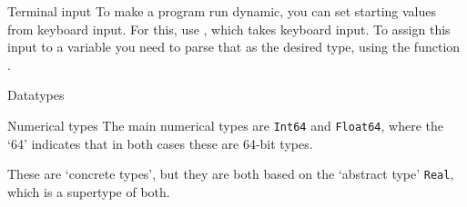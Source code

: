 \begin{comment}
\begin{exercise}
  \label{q:initvar}
  \begin{lstlisting}
    #include <iostream>
    using std::cout;
    using std::endl;
    int main() {
      int i;
      int j = i+1;
      cout << j << endl;
      return 0;
    }
  \end{lstlisting}
  What happens?
  \begin{enumerate}
  \item Compiler error
  \item Output: \lstinline{1}
  \item Output is undefined
  \item Error message during running the program.
  \end{enumerate}
\end{exercise}

\end{comment}

\begin{block}{Terminal input}
  \label{sl:cin}
  To make a program run dynamic, you can set starting values from
  keyboard input. For this, use , which takes
  keyboard input. To assign this input to a variable you need to parse
  that as the desired type, using the function .

\end{block}

 {Datatypes}
\label{sec:jtypes}

\begin{block}{Numerical types}
  The main numerical types are \lstinline{Int64} and \lstinline{Float64},
  where the `64' indicates that in both cases these are 64-bit types.

  These are `concrete types', but they are both based on the `abstract
  type' \lstinline{Real}, which is a supertype of both.
\end{block}

